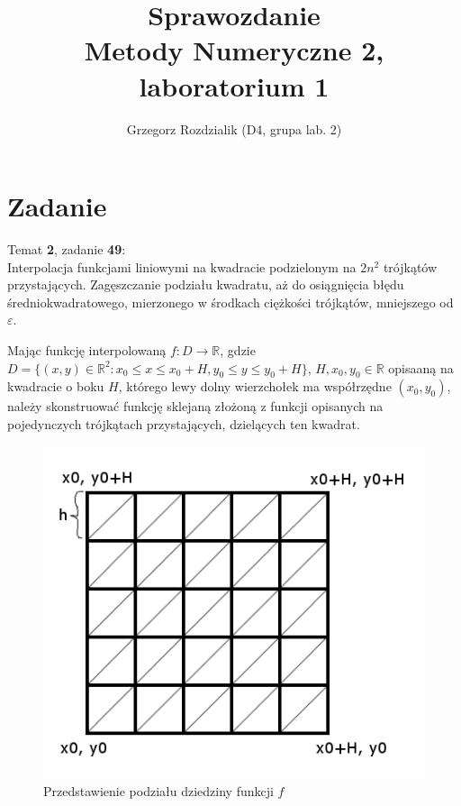 \documentclass[12pt]{article}
\begin{document}
	\title{Sprawozdanie\\Metody Numeryczne 2, laboratorium 1}
	\author{Grzegorz Rozdzialik (D4, grupa lab. 2)}
	\maketitle	
	
	\section{Zadanie}
	{\Large Temat \textbf{2}, zadanie \textbf{49}:}\\
	Interpolacja funkcjami liniowymi na kwadracie podzielonym na $2n^2$ trójkątów przystających. Zagęszczanie podziału kwadratu, aż do osiągnięcia błędu średniokwadratowego, mierzonego w środkach ciężkości trójkątów, mniejszego od $\varepsilon$.
	
	Mając funkcję interpolowaną $f: D \to \mathbb{R}$, gdzie $D = \{ (x, y) \in \mathbb{R}^2: x_0 \leq x \leq x_0 + H, y_0 \leq y \leq y_0 + H\}$, $H, x_0, y_0 \in \mathbb{R}$ opisaaną na kwadracie o boku $H$, którego lewy dolny wierzchołek ma współrzędne $(x_0, y_0)$, należy skonstruować funkcję sklejaną złożoną z funkcji opisanych na pojedynczych trójkątach przystających, dzielących ten kwadrat.
	
	\begin{figure}[]
		\includegraphics[scale=0.8]{square-division.png}
		\caption{Przedstawienie podziału dziedziny funkcji $f$}
	\end{figure}
\end{document}
